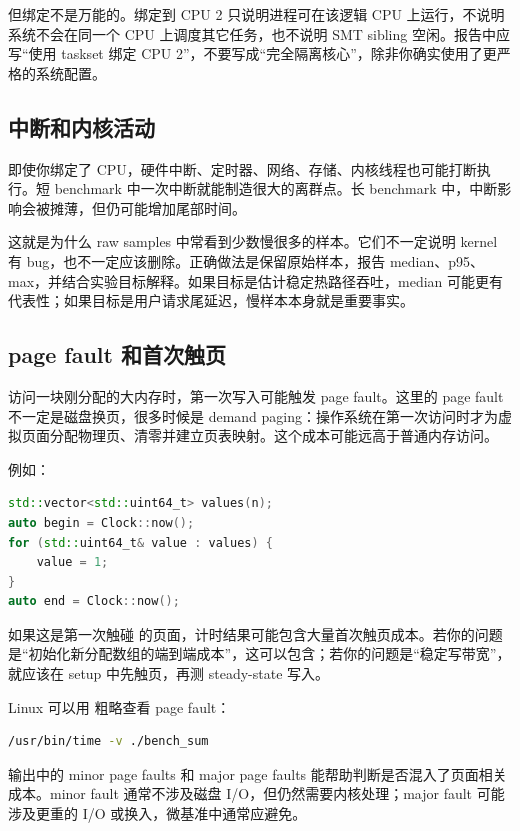 但绑定不是万能的。绑定到 CPU 2 只说明进程可在该逻辑 CPU 上运行，不说明系统不会在同一个 CPU 上调度其它任务，也不说明 SMT sibling 空闲。报告中应写“使用 taskset 绑定 CPU 2”，不要写成“完全隔离核心”，除非你确实使用了更严格的系统配置。

\subsection{中断和内核活动}

即使你绑定了 CPU，硬件中断、定时器、网络、存储、内核线程也可能打断执行。短 benchmark 中一次中断就能制造很大的离群点。长 benchmark 中，中断影响会被摊薄，但仍可能增加尾部时间。

这就是为什么 raw samples 中常看到少数慢很多的样本。它们不一定说明 kernel 有 bug，也不一定应该删除。正确做法是保留原始样本，报告 median、p95、max，并结合实验目标解释。如果目标是估计稳定热路径吞吐，median 可能更有代表性；如果目标是用户请求尾延迟，慢样本本身就是重要事实。

\subsection{page fault 和首次触页}

访问一块刚分配的大内存时，第一次写入可能触发 page fault。这里的 page fault 不一定是磁盘换页，很多时候是 demand paging：操作系统在第一次访问时才为虚拟页面分配物理页、清零并建立页表映射。这个成本可能远高于普通内存访问。

例如：

\begin{lstlisting}[language=C++]
std::vector<std::uint64_t> values(n);
auto begin = Clock::now();
for (std::uint64_t& value : values) {
    value = 1;
}
auto end = Clock::now();
\end{lstlisting}

如果这是第一次触碰  的页面，计时结果可能包含大量首次触页成本。若你的问题是“初始化新分配数组的端到端成本”，这可以包含；若你的问题是“稳定写带宽”，就应该在 setup 中先触页，再测 steady-state 写入。

Linux 可以用  粗略查看 page fault：

\begin{lstlisting}[language=bash]
/usr/bin/time -v ./bench_sum
\end{lstlisting}

输出中的 minor page faults 和 major page faults 能帮助判断是否混入了页面相关成本。minor fault 通常不涉及磁盘 I/O，但仍然需要内核处理；major fault 可能涉及更重的 I/O 或换入，微基准中通常应避免。

